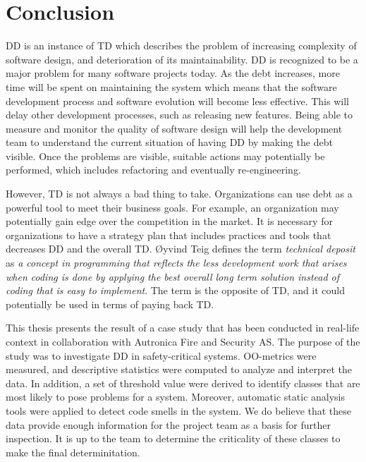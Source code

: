 
\chapter{Conclusion}
\label{chap:conclusion}


DD is an instance of TD which describes the problem of increasing complexity of software design, and deterioration of its maintainability. DD is recognized to be a major problem for many software projects today. As the debt increases, more time will be spent on maintaining the system which means that the software development process and software evolution will become less effective. This will delay other development processes, such as releasing new features. Being able to measure and monitor the quality of software design will help the development team to understand the current situation of having DD by making the debt visible. Once the problems are visible, suitable actions may potentially be performed, which includes refactoring and eventually re-engineering. 

However, TD is not always a bad thing to take. Organizations can use debt as a powerful tool to meet their business goals. For example, an organization may potentially gain edge over the competition in the market. It is necessary for organizations to have a strategy plan that includes practices and tools that decreases DD and the overall TD. Øyvind Teig defines the term \textit{technical deposit} as \textit{a concept in programming that reflects the less development work that arises when coding is done by applying the best overall long term solution instead of coding that is easy to implement}. The term is the opposite of TD, and it could potentially be used in terms of paying back TD. 

This thesis presents the result of a case study that has been conducted in real-life context in collaboration with Autronica Fire and Security AS. The purpose of the study was to investigate DD in safety-critical systems. OO-metrics were measured, and descriptive statistics were computed to analyze and interpret the data. In addition, a set of threshold value were derived to identify classes that are most likely to pose problems for a system. Moreover, automatic static analysis tools were applied to detect code smells in the system. We do believe that these data provide enough information for the project team as a basis for further inspection. It is up to the team to determine the criticality of these classes to make the final determinitation.


